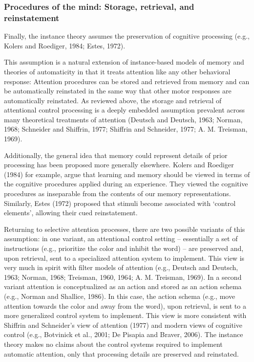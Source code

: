 \documentclass[]{DissertateCUNY}
\begin{document}
\hypertarget{procedures-of-the-mind-storage-retrieval-and-reinstatement}{%
\subsubsection{Procedures of the mind: Storage, retrieval, and
reinstatement}\label{procedures-of-the-mind-storage-retrieval-and-reinstatement}}

Finally, the instance theory assumes the preservation of cognitive
processing (e.g., Kolers and Roediger, 1984; Estes, 1972).

This assumption is a natural extension of instance-based models of
memory and theories of automaticity in that it treats attention like any
other behavioral response: Attention procedures can be stored and
retrieved from memory and can be automatically reinstated in the same
way that other motor responses are automatically reinstated. As reviewed
above, the storage and retrieval of attentional control processing is a
deeply embedded assumption prevalent across many theoretical treatments
of attention (Deutsch and Deutsch, 1963; Norman, 1968; Schneider and
Shiffrin, 1977; Shiffrin and Schneider, 1977; A. M. Treisman, 1969).

Additionally, the general idea that memory could represent details of
prior processing has been proposed more generally elsewhere. Kolers and
Roediger (1984) for example, argue that learning and memory should be
viewed in terms of the cognitive procedures applied during an
experience. They viewed the cognitive procedures as inseparable from the
contents of our memory representations. Similarly, Estes (1972) proposed
that stimuli become associated with `control elements', allowing their
cued reinstatement.

Returning to selective attention processes, there are two possible
variants of this assumption: in one variant, an attentional control
setting -- essentially a set of instructions (e.g., prioritize the color
and inhibit the word) -- are preserved and, upon retrieval, sent to a
specialized attention system to implement. This view is very much in
spirit with filter models of attention (e.g., Deutsch and Deutsch, 1963;
Norman, 1968; Treisman, 1960, 1964; A. M. Treisman, 1969). In a second
variant attention is conceptualized as an action and stored as an action
schema (e.g., Norman and Shallice, 1986). In this case, the action
schema (e.g., move attention towards the color and away from the word),
upon retrieval, is sent to a more generalized control system to
implement. This view is more consistent with Shiffrin and Schneider's
view of attention (1977) and modern views of cognitive control (e.g.,
Botvinick et al., 2001; De Pisapia and Braver, 2006). The instance
theory makes no claims about the control systems required to implement
automatic attention, only that processing details are preserved and
reinstated.
\end{document}
